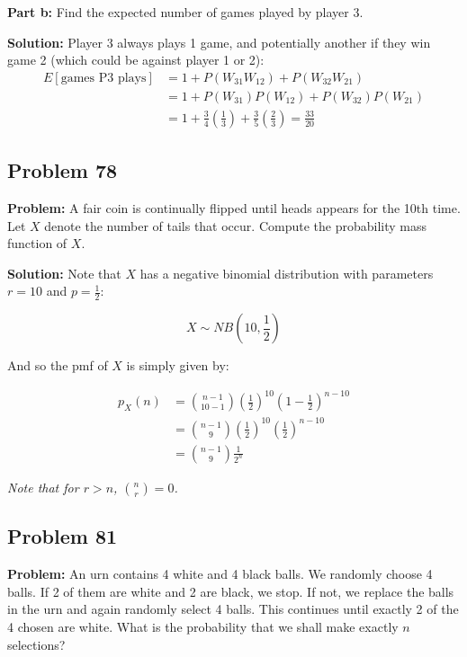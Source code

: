 \documentclass{article}
\begin{document}
\noindent\textbf{Part b:} Find the expected number of games played by player 3.
\bigskip

\noindent\textbf{Solution:} Player 3 always plays 1 game, and potentially another if they win game 2 (which could be against player 1 or 2):
\begin{align*}
    E[\text{games P3 plays}]&=1+P(W_{31}W_{12})+P(W_{32}W_{21})\\
    &=1+P(W_{31})P(W_{12})+P(W_{32})P(W_{21})\tag{independence}\\
    &=1+\frac{3}{4}\left(\frac{1}{3}\right)+\frac{3}{5}\left(\frac{2}{3}\right)=\frac{33}{20}
\end{align*}
\pagebreak

\subsection*{Problem 78}
\noindent\textbf{Problem:} A fair coin is continually flipped until heads appears for the 10th time. Let $X$ denote the number of tails that occur. Compute the probability mass function of $X$.
\bigskip

\noindent\textbf{Solution:} Note that $X$ has a negative binomial distribution with parameters $r=10$ and $p=\frac{1}{2}$:

\begin{equation*}
    X\sim NB\left(10,\frac{1}{2}\right)
\end{equation*}

And so the pmf of $X$ is simply given by:

\begin{align*}
    p_X(n)&=\binom{n-1}{10-1}\left(\frac{1}{2}\right)^{10}\left(1-\frac{1}{2}\right)^{n-10}\\
    &=\binom{n-1}{9}\left(\frac{1}{2}\right)^{10}\left(\frac{1}{2}\right)^{n-10}\\
    &=\binom{n-1}{9}\frac{1}{2^n}
\end{align*}

\textit{Note that for $r>n$, $\binom{n}{r}=0$.}

\subsection*{Problem 81}
\noindent\textbf{Problem:} An urn contains 4 white and 4 black balls. We randomly choose 4 balls. If 2 of them are white and 2 are black, we stop. If not, we replace the balls in the urn and again randomly select 4 balls. This continues until exactly 2 of the 4 chosen are white. What is the probability that we shall make exactly $n$ selections?
\bigskip
\end{document}

